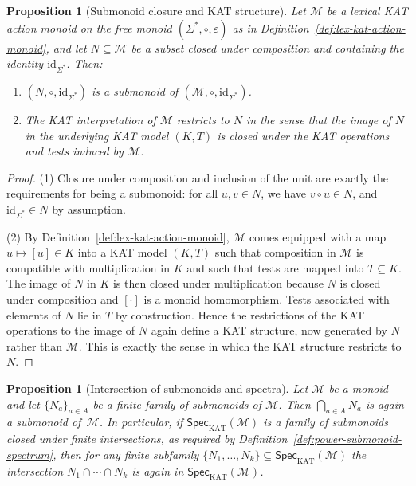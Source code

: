 \documentclass[11pt]{book}
\theoremstyle{plain}
\newtheorem{proposition}[theorem]{Proposition}
\theoremstyle{definition}
\theoremstyle{remark}
\begin{document}
\begin{proposition}[Submonoid closure and KAT structure]
\label{prop:submonoid-closure-kat}
Let $\mathcal{M}$ be a lexical KAT action monoid on the free monoid
$(\Sigma^*,\circ,\varepsilon)$ as in
Definition~\ref{def:lex-kat-action-monoid}, and let $N\subseteq\mathcal{M}$
be a subset closed under composition and containing the identity
$\mathrm{id}_{\Sigma^*}$. Then:
\begin{enumerate}
  \item $(N,\circ,\mathrm{id}_{\Sigma^*})$ is a submonoid of
        $(\mathcal{M},\circ,\mathrm{id}_{\Sigma^*})$.
  \item The KAT interpretation of $\mathcal{M}$ restricts to $N$ in
        the sense that the image of $N$ in the underlying KAT model
        $(K,T)$ is closed under the KAT operations and tests induced
        by $\mathcal{M}$.
\end{enumerate}
\end{proposition}

\begin{proof}
(1) Closure under composition and inclusion of the unit are exactly
the requirements for being a submonoid: for all $u,v\in N$, we have
$v\circ u\in N$, and $\mathrm{id}_{\Sigma^*}\in N$ by assumption.

(2) By Definition~\ref{def:lex-kat-action-monoid}, $\mathcal{M}$ comes
equipped with a map $u\mapsto [u]\in K$ into a KAT model $(K,T)$ such
that composition in $\mathcal{M}$ is compatible with multiplication in
$K$ and such that tests are mapped into $T\subseteq K$. The image of
$N$ in $K$ is then closed under multiplication because $N$ is closed
under composition and $[\cdot]$ is a monoid homomorphism. Tests
associated with elements of $N$ lie in $T$ by construction. Hence the
restrictions of the KAT operations to the image of $N$ again define a
KAT structure, now generated by $N$ rather than $\mathcal{M}$. This is
exactly the sense in which the KAT structure restricts to $N$.
\end{proof}

\begin{proposition}[Intersection of submonoids and spectra]
\label{prop:intersection-submonoids-spectra}
Let $\mathcal{M}$ be a monoid and let $\{N_a\}_{a\in A}$ be a finite
family of submonoids of $\mathcal{M}$. Then $\bigcap_{a\in A} N_a$ is
again a submonoid of~$\mathcal{M}$. In particular, if
$\mathsf{Spec}_{\mathrm{KAT}}(\mathcal{M})$ is a family of submonoids
closed under finite intersections, as required by
Definition~\ref{def:power-submonoid-spectrum}, then for any finite
subfamily $\{N_1,\dots,N_k\}\subseteq\mathsf{Spec}_{\mathrm{KAT}}(\mathcal{M})$
the intersection $N_1\cap\cdots\cap N_k$ is again in
$\mathsf{Spec}_{\mathrm{KAT}}(\mathcal{M})$.
\end{proposition}
\end{document}
